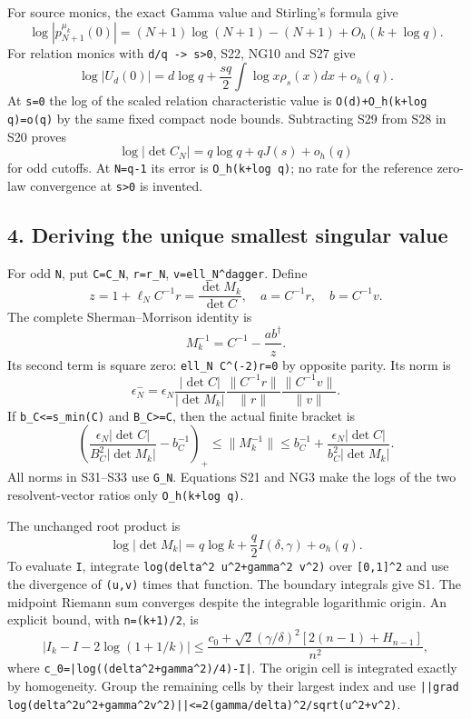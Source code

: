 For source monics, the exact Gamma value and Stirling's formula give \[
 \log|p_{N+1}^{\mu_k}(0)|
 =(N+1)\log(N+1)-(N+1)+O_h(k+\log q).                             \tag{S28}
\] For relation monics with \texttt{d/q\ -\textgreater{}\ s\textgreater{}0}, S22, NG10 and S27 give \[
 \log|U_d(0)|=d\log q+\frac{sq}{2}\int\log x\rho_s(x)dx+o_h(q).    \tag{S29}
\] At \texttt{s=0} the log of the scaled relation characteristic value is \nolinkurl{O(d)+O_h(k+log q)=o(q)} by the same fixed compact node bounds. Subtracting S29 from S28 in S20 proves \[
 \boxed{\log|\det C_N|=q\log q+qJ(s)+o_h(q)}                      \tag{S30}
\] for odd cutoffs. At \texttt{N=q-1} its error is \texttt{O\_h(k+log\ q)}; no rate for the reference zero-law convergence at \texttt{s\textgreater{}0} is invented.

\subsection{4. Deriving the unique smallest singular value}\label{deriving-the-unique-smallest-singular-value}

For odd \texttt{N}, put \texttt{C=C\_N}, \texttt{r=r\_N}, \texttt{v=ell\_N\^{}dagger}. Define \[
 z=1+\ell_NC^{-1}r=\frac{\det M_k}{\det C},\quad
 a=C^{-1}r,\quad b=C^{-1}v.
\] The complete Sherman--Morrison identity is \[
 M_k^{-1}=C^{-1}-\frac{ab^\dagger}{z}.                            \tag{S31}
\] Its second term is square zero: \texttt{ell\_N\ C\^{}(-2)r=0} by opposite parity. Its norm is \[
 \epsilon_N^-=
 \epsilon_N\frac{|\det C|}{|\det M_k|}
 \frac{\|C^{-1}r\|}{\|r\|}\frac{\|C^{-1}v\|}{\|v\|}.             \tag{S32}
\] If \texttt{b\_C\textless{}=s\_min(C)} and \texttt{B\_C\textgreater{}=\textbar{}\textbar{}C\textbar{}\textbar{}}, then the actual finite bracket is \[
 \left(\frac{\epsilon_N|\det C|}{B_C^2|\det M_k|}-b_C^{-1}\right)_+
 \le\|M_k^{-1}\|
 \le b_C^{-1}+\frac{\epsilon_N|\det C|}{b_C^2|\det M_k|}.           \tag{S33}
\] All norms in S31--S33 use \texttt{G\_N}. Equations S21 and NG3 make the logs of the two resolvent-vector ratios only \texttt{O\_h(k+log\ q)}.

The unchanged root product is \[
 \log|\det M_k|=q\log k+\frac q2 I(\delta,\gamma)+o_h(q).           \tag{S34}
\] To evaluate \texttt{I}, integrate \nolinkurl{log(delta^2 u^2+gamma^2 v^2)} over \texttt{{[}0,1{]}\^{}2} and use the divergence of \texttt{(u,v)} times that function. The boundary integrals give S1. The midpoint Riemann sum converges despite the integrable logarithmic origin. An explicit bound, with \texttt{n=(k+1)/2}, is \[
 \left|I_k-I-2\log(1+1/k)\right|
 \le\frac{c_0+\sqrt2(\gamma/\delta)^2[2(n-1)+H_{n-1}]}{n^2},       \tag{S35}
\] where \nolinkurl{c_0=|log((delta^2+gamma^2)/4)-I|}. The origin cell is integrated exactly by homogeneity. Group the remaining cells by their largest index and use \nolinkurl{||grad log(delta^2u^2+gamma^2v^2)||<=2(gamma/delta)^2/sqrt(u^2+v^2)}.


